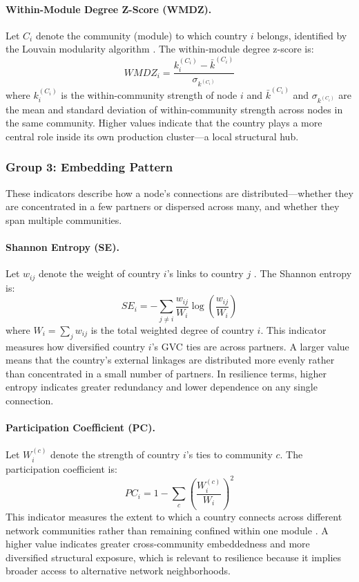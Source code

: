 \documentclass[12pt]{article}
\begin{document}
\paragraph{Within-Module Degree Z-Score (WMDZ).} Let $C_i$ denote the community (module) to which country $i$ belongs, identified by the Louvain modularity algorithm \citep{newmangirvan2004, guimeraamaral2005}. The within-module degree z-score is:
\begin{equation}
WMDZ_i = \frac{k_i^{(C_i)} - \bar{k}^{(C_i)}}{\sigma_{k^{(C_i)}}}
\end{equation}
where $k_i^{(C_i)}$ is the within-community strength of node $i$ and $\bar{k}^{(C_i)}$ and $\sigma_{k^{(C_i)}}$ are the mean and standard deviation of within-community strength across nodes in the same community. Higher values indicate that the country plays a more central role inside its own production cluster---a local structural hub.

\subsubsection*{Group 3: Embedding Pattern}

These indicators describe how a node's connections are distributed---whether they are concentrated in a few partners or dispersed across many, and whether they span multiple communities.

\paragraph{Shannon Entropy (SE).} Let $w_{ij}$ denote the weight of country $i$'s links to country $j$ \citep{shannon1948}. The Shannon entropy is:
\begin{equation}
SE_i = -\sum_{j \neq i} \frac{w_{ij}}{W_i} \log\left(\frac{w_{ij}}{W_i}\right)
\end{equation}
where $W_i = \sum_j w_{ij}$ is the total weighted degree of country $i$. This indicator measures how diversified country $i$'s GVC ties are across partners. A larger value means that the country's external linkages are distributed more evenly rather than concentrated in a small number of partners. In resilience terms, higher entropy indicates greater redundancy and lower dependence on any single connection.

\paragraph{Participation Coefficient (PC).} Let $W_i^{(c)}$ denote the strength of country $i$'s ties to community $c$. The participation coefficient is:
\begin{equation}
PC_i = 1 - \sum_{c} \left(\frac{W_i^{(c)}}{W_i}\right)^2
\end{equation}
This indicator measures the extent to which a country connects across different network communities rather than remaining confined within one module \citep{guimeraamaral2005}. A higher value indicates greater cross-community embeddedness and more diversified structural exposure, which is relevant to resilience because it implies broader access to alternative network neighborhoods.
\end{document}
